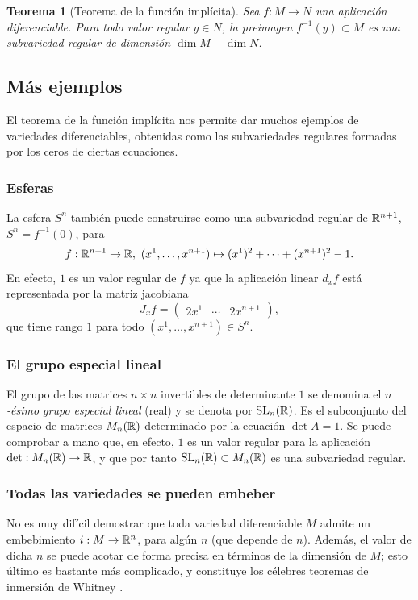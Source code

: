 \documentclass[11pt,a4paper]{amsbook}
\newtheorem{thm}[subsection]{Teorema}
\theoremstyle{remark} \newtheorem{rmk}[subsection]{Observación}
\theoremstyle{definition} \newtheorem{defn}[subsection]{Definición}
\theoremstyle{definition} \newtheorem{ex}[subsection]{Ejemplo}
\theoremstyle{definition} \newtheorem{ej}[subsection]{Ejercicio}
\begin{document}
\begin{thm}[Teorema de la función implícita]
Sea $f:M\rightarrow N$ una aplicación diferenciable. Para todo valor regular $y\in N$, la preimagen $f^{-1}(y)\subset M$ es una subvariedad regular de dimensión $\dim M - \dim N$.
\end{thm}

\subsection{Más ejemplos}
El teorema de la función implícita nos permite dar muchos ejemplos de variedades diferenciables, obtenidas como las subvariedades regulares formadas por los ceros de ciertas ecuaciones.

\subsubsection{Esferas} La esfera $S^n$ también puede construirse como una subvariedad regular de $\mathbb R^{n+1}$, $S^n = f^{-1}(0)$, para
\begin{equation*}
f: \RR^{n+1} \rightarrow \RR,\ (x^1,\dots,x^{n+1}) \mapsto (x^1)^2 + \cdots + (x^{n+1})^2 - 1.
\end{equation*}
En efecto, $1$ es un valor regular de $f$ ya que la aplicación linear $d_xf$ está representada por la matriz jacobiana
\begin{equation*}
J_xf=\begin{pmatrix}
2 x^1 & \cdots & 2x^{n+1}
\end{pmatrix},
\end{equation*}
que tiene rango $1$ para todo $(x^1,\dots,x^{n+1}) \in S^n$.

\subsubsection{El grupo especial lineal} El grupo de las matrices $n\times n$ invertibles de determinante $1$ se denomina el \emph{$n$-ésimo grupo especial lineal} (real) y se denota por $\mathrm{SL}_n(\mathbb R)$. Es el subconjunto del espacio de matrices $M_n(\mathbb R)$ determinado por la ecuación $\det A = 1$. Se puede comprobar a mano que, en efecto, $1$ es un valor regular para la aplicación $\det: M_n(\mathbb R) \rightarrow \mathbb R$, y que por tanto $\mathrm{SL}_n(\mathbb R)\subset M_n(\mathbb R)$ es una subvariedad regular.

\subsubsection{Todas las variedades se pueden embeber}
No es muy difícil demostrar  que toda variedad diferenciable $M$ admite un embebimiento $i:M\rightarrow \mathbb R^n$, para algún $n$ (que depende de $n$). Además, el valor de dicha $n$ se puede acotar de forma precisa en términos de la dimensión de $M$; esto último es bastante más complicado, y constituye los célebres teoremas de inmersión de Whitney .
\end{document}
